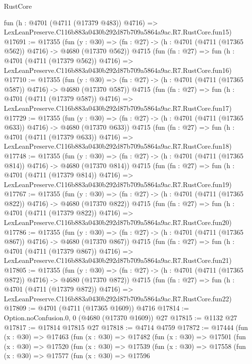 \begin{lexlean}{RustCore}
\begin{coremodule}
    fun (h : @4701 (@4711 (@17379 @483)) @4716) =>
    LexLeanPreserve.C116b883a0430b292d87b709a5864a9ac.R7.RustCore.fun15)
@17691 := @17355
    (fun (y : @30) => (fn : @27) -> (h : @4701 (@4711 (@17365 @562)) @4716) -> @4680 (@17370 @562))
    @4715
    (fun (fn : @27) =>
    fun (h : @4701 (@4711 (@17379 @562)) @4716) =>
    LexLeanPreserve.C116b883a0430b292d87b709a5864a9ac.R7.RustCore.fun16)
@17710 := @17355
    (fun (y : @30) => (fn : @27) -> (h : @4701 (@4711 (@17365 @587)) @4716) -> @4680 (@17370 @587))
    @4715
    (fun (fn : @27) =>
    fun (h : @4701 (@4711 (@17379 @587)) @4716) =>
    LexLeanPreserve.C116b883a0430b292d87b709a5864a9ac.R7.RustCore.fun17)
@17729 := @17355
    (fun (y : @30) => (fn : @27) -> (h : @4701 (@4711 (@17365 @633)) @4716) -> @4680 (@17370 @633))
    @4715
    (fun (fn : @27) =>
    fun (h : @4701 (@4711 (@17379 @633)) @4716) =>
    LexLeanPreserve.C116b883a0430b292d87b709a5864a9ac.R7.RustCore.fun18)
@17748 := @17355
    (fun (y : @30) => (fn : @27) -> (h : @4701 (@4711 (@17365 @814)) @4716) -> @4680 (@17370 @814))
    @4715
    (fun (fn : @27) =>
    fun (h : @4701 (@4711 (@17379 @814)) @4716) =>
    LexLeanPreserve.C116b883a0430b292d87b709a5864a9ac.R7.RustCore.fun19)
@17767 := @17355
    (fun (y : @30) => (fn : @27) -> (h : @4701 (@4711 (@17365 @822)) @4716) -> @4680 (@17370 @822))
    @4715
    (fun (fn : @27) =>
    fun (h : @4701 (@4711 (@17379 @822)) @4716) =>
    LexLeanPreserve.C116b883a0430b292d87b709a5864a9ac.R7.RustCore.fun20)
@17786 := @17355
    (fun (y : @30) => (fn : @27) -> (h : @4701 (@4711 (@17365 @867)) @4716) -> @4680 (@17370 @867))
    @4715
    (fun (fn : @27) =>
    fun (h : @4701 (@4711 (@17379 @867)) @4716) =>
    LexLeanPreserve.C116b883a0430b292d87b709a5864a9ac.R7.RustCore.fun21)
@17805 := @17355
    (fun (y : @30) => (fn : @27) -> (h : @4701 (@4711 (@17365 @872)) @4716) -> @4680 (@17370 @872))
    @4715
    (fun (fn : @27) =>
    fun (h : @4701 (@4711 (@17379 @872)) @4716) =>
    LexLeanPreserve.C116b883a0430b292d87b709a5864a9ac.R7.RustCore.fun22)
@17809 := @4701 (@4711 (@17365 @1609)) @4716
@17814 := Option.noConfusion.{0, 0} (@4680 (@17370 @1609)) @27
@17815 := @1132 @27
@17817 := @17814 @17815 @27
@17818 := @4714 @4759
@17872 := @17444
    (fun (x : @30) =>
    @17463
      (fun (x : @30) =>
      @17482
        (fun (x : @30) =>
        @17501
          (fun (x : @30) =>
          @17520
            (fun (x : @30) =>
            @17539
              (fun (x : @30) =>
              @17558
                (fun (x : @30) =>
                @17577
                  (fun (x : @30) =>
                  @17596

\end{coremodule}
\end{lexlean}
